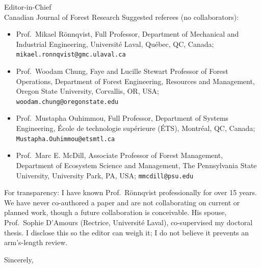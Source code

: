 \documentclass[11pt,letterpaper]{letter}
\begin{document}
\begin{letter}{Editor-in-Chief\\Canadian Journal of Forest Research}
Suggested referees (no collaborators):
\begin{itemize}
  \item Prof.\ Mikael R\"onnqvist, Full Professor, Department of Mechanical and Industrial
        Engineering, Universit\'e Laval, Qu\'ebec, QC, Canada;
        \texttt{mikael.ronnqvist@gmc.ulaval.ca}
  \item Prof.\ Woodam Chung, Faye and Lucille Stewart Professor of Forest Operations, Department of
        Forest Engineering, Resources and Management, Oregon State University, Corvallis, OR, USA;
        \texttt{woodam.chung@oregonstate.edu}
  \item Prof.\ Mustapha Ouhimmou, Full Professor, Department of Systems Engineering, \'Ecole de
        technologie sup\'erieure (\'ETS), Montr\'eal, QC, Canada;
        \texttt{Mustapha.Ouhimmou@etsmtl.ca}
  \item Prof.\ Marc E. McDill, Associate Professor of Forest Management, Department of Ecosystem
        Science and Management, The Pennsylvania State University, University Park, PA, USA;
        \texttt{mmcdill@psu.edu}
\end{itemize}

For transparency: I have known Prof.\ R\"onnqvist professionally for over 15 years. We have never
co-authored a paper and are not collaborating on current or planned work, though a future
collaboration is conceivable. His spouse, Prof.\ Sophie D'Amours (Rectrice, Universit\'e Laval),
co-supervised my doctoral thesis. I disclose this so the editor can weigh it; I do not believe it
prevents an arm's-length review.

\closing{Sincerely,}
\end{letter}
\end{document}
